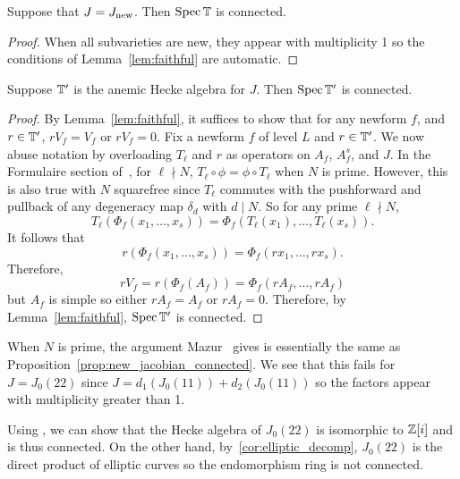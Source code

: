 \documentclass[11pt, proquest]{uwthesis}
\begin{document}
\begin{proposition}\label{prop:new_jacobian_connected} 
    Suppose that $J=J_{\operatorname{new}}$. Then $\operatorname{Spec}\mathbb{T}$ is connected.
\end{proposition}
\begin{proof}
    When all subvarieties are new, they appear with multiplicity 1 so the
    conditions of Lemma~\ref{lem:faithful} are automatic.
\end{proof}

\begin{proposition}
    Suppose $\mathbb{T}'$ is the anemic Hecke algebra for $J$. Then $\operatorname{Spec}\mathbb{T}'$ is
    connected.
\end{proposition}
\begin{proof}
    By Lemma~\ref{lem:faithful}, it suffices to show that for any newform
    $f$, and $r\in \mathbb{T}'$, $rV_f=V_f$ or $rV_f=0$. Fix a newform $f$ of level
    $L$ and $r\in \mathbb{T}'$. We now abuse notation by overloading $T_\ell$ and $r$
    as operators on $A_f$, $A_f^s$, and $J$. In the Formulaire section
    of~\cite{ribet:old}, for $\ell\nmid N$, $T_\ell\circ \phi=\phi\circ T_\ell$
    when $N$ is prime. However, this is also true with $N$ squarefree since
    $T_\ell$ commutes with the pushforward and pullback of any degeneracy map
    $\delta_d$ with $d\mid N$. So for any prime $\ell\nmid N$, 
    \[
        T_\ell(\Phi_f(x_1,\ldots,x_s))
        = \Phi_f(T_\ell(x_1),\ldots,T_\ell(x_s)).
    \]
    It follows that
    \[
        r(\Phi_f(x_1,\ldots,x_s))
        = \Phi_f(rx_1,\ldots,rx_s).
    \]
    Therefore,
    \[
        rV_f = r(\Phi_f(A_f)) = \Phi_f(rA_f,\ldots,rA_f)
    \]
    but $A_f$ is simple so either $rA_f=A_f$ or $rA_f=0$. Therefore, by
    Lemma~\ref{lem:faithful}, $\operatorname{Spec}\mathbb{T}'$ is connected.
\end{proof}

\begin{example}
    When $N$ is prime, the argument Mazur~\cite[Prop. 10.6]{mazur:eisenstein}
    gives is essentially the same as
    Proposition~\ref{prop:new_jacobian_connected}. We see that this fails for
    $J=J_0(22)$ since $J=d_1(J_0(11))+d_2(J_0(11))$ so the factors appear with
    multiplicity greater than 1.

    Using \sage, we can show that the Hecke algebra of $J_0(22)$ is isomorphic
    to $\mathbb{Z}[i]$ and is thus connected. On the other hand,
    by~\ref{cor:elliptic_decomp}, $J_0(22)$ is the direct product of elliptic
    curves so the endomorphism ring is not connected.
\end{example}
\end{document}
